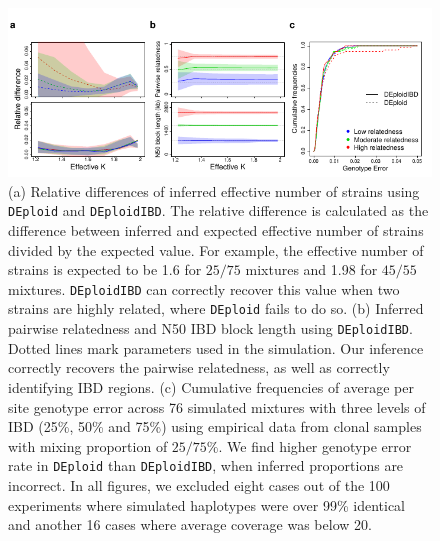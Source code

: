 \documentclass[9pt,lineno]{elife}
\begin{document}
\begin{figure}[htp]
  \begin{center}
  \includegraphics[width=\textwidth]{Fig2.pdf}
  \caption{(a) Relative differences of inferred effective number of strains using \texttt{DEploid} and \texttt{DEploidIBD}. The relative difference is calculated as the difference between inferred and expected effective number of strains divided by the expected value. For example, the effective number of strains is expected to be 1.6 for $25/75$ mixtures and 1.98 for $45/55$ mixtures. \texttt{DEploidIBD} can correctly recover this value when two strains are highly related, where \texttt{DEploid} fails to do so. (b) Inferred pairwise relatedness and N50 IBD block length using \texttt{DEploidIBD}. Dotted lines mark parameters used in the simulation. Our inference correctly recovers the pairwise relatedness, as well as correctly identifying IBD regions. (c) Cumulative frequencies of average per site genotype error across 76 simulated mixtures with three levels of IBD (25\%, 50\% and 75\%) using empirical data from clonal samples with mixing proportion of $25/75\%$. We find higher genotype error rate in \texttt{DEploid} than \texttt{DEploidIBD}, when inferred proportions are incorrect. In all figures, we excluded eight cases out of the 100 experiments where simulated haplotypes were over 99\% identical and another 16 cases where average coverage was below 20.
}\label{fig:benchmark}
  \end{center}

\end{figure}
\end{document}
